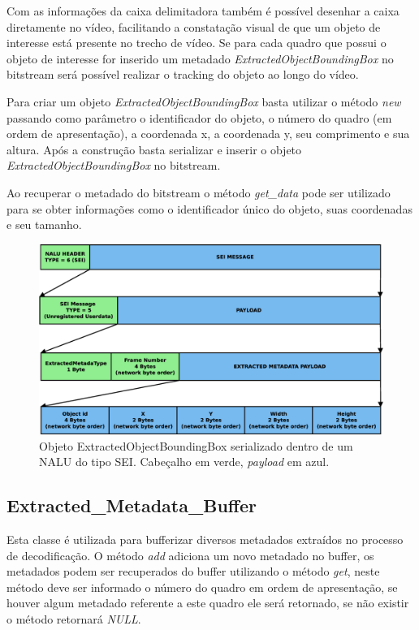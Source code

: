 Com as informações da caixa delimitadora também é possível desenhar a caixa diretamente no vídeo, facilitando a constatação visual de que um objeto de interesse está presente no trecho de vídeo. Se para cada quadro que possui o objeto de interesse for inserido um metadado \textit{ExtractedObjectBoundingBox} no bitstream será possível realizar o tracking do objeto ao longo do vídeo. 

Para criar um objeto \textit{ExtractedObjectBoundingBox} basta utilizar o método \textit{new} passando como parâmetro o identificador do objeto, o número do quadro (em ordem de apresentação), a coordenada x, a coordenada y, seu comprimento e sua altura. Após a construção basta serializar e inserir o objeto \textit{ExtractedObjectBoundingBox} no bitstream. 

Ao recuperar o metadado do bitstream o método \textit{get\_data} pode ser utilizado para se obter informações como o identificador único do objeto, suas coordenadas e seu tamanho.


\begin{figure}[H]
\centering
\includegraphics[scale=0.4]{imagens/fig12.eps}
\caption{Objeto ExtractedObjectBoundingBox serializado dentro de um NALU do tipo SEI. Cabeçalho em verde, \textit{payload} em azul.}
\label{fig:extracted_object_bounding_box_on_nalu}
\end{figure}


\subsection{ Extracted\_Metadata\_Buffer }

Esta classe é utilizada para bufferizar diversos metadados extraídos no processo de decodificação. O método \textit{add} adiciona um novo metadado no buffer, os metadados podem ser recuperados do buffer utilizando o método \textit{get}, neste método deve ser informado o número do quadro em ordem de apresentação, se houver algum metadado referente a este quadro ele será retornado, se não existir o método retornará \textit{NULL}.

